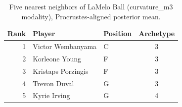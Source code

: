 \begin{table}[htbp]
  \centering\small
  \begin{tabular}{rllc}
    \toprule
    Rank & Player & Position & Archetype \\
    \midrule
    1 & Victor Wembanyama & C & 3 \\
    2 & Korleone Young & F & 3 \\
    3 & Kristaps Porzingis & F & 3 \\
    4 & Trevon Duval & G & 3 \\
    5 & Kyrie Irving & G & 4 \\
    \bottomrule
  \end{tabular}
  \caption{Five nearest neighbors of LaMelo Ball (curvature_m3 modality), Procrustes-aligned posterior mean.}
  \label{tab:LaMelo_Ball_neighbors_curvature_m3}
\end{table}

